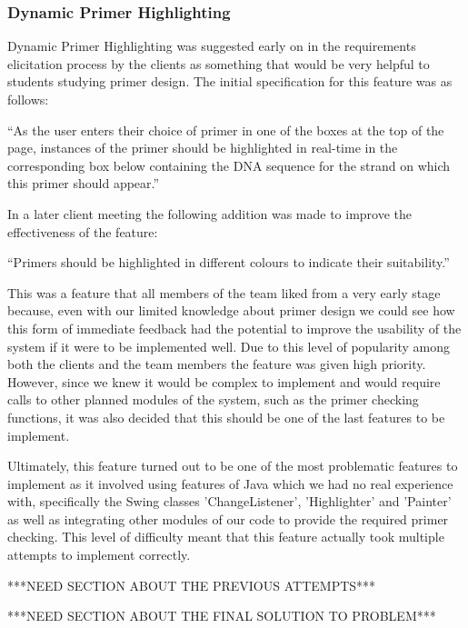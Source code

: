 \subsubsection{Dynamic Primer Highlighting}

Dynamic Primer Highlighting was suggested early on in the requirements
elicitation process by the clients as something that would be very
helpful to students studying primer design. The initial specification
for this feature was as follows:
	
“As the user enters their choice of primer in one of the boxes at the
top of the page, instances of the primer should be highlighted in
real-time in the corresponding box below containing the DNA sequence for
the strand on which this primer should appear.”

In a later client meeting the following addition was made to improve the
effectiveness of the feature:

“Primers should be highlighted in different colours to indicate their
suitability.”

This was a feature that all members of the team liked from a very early
stage because, even with our limited knowledge about primer design we
could see how this form of immediate feedback had the potential to
improve the usability of the system if it were to be implemented well.
Due to this level of popularity among both the clients and the team
members the feature was given high priority. However, since we knew it
would be complex to implement and would require calls to other planned
modules of the system, such as the primer checking functions, it was
also decided that this should be one of the last features to be
implement.

Ultimately, this feature turned out to be one of the most problematic
features to implement as it involved using features of Java which we had
no real experience with, specifically the Swing classes
'ChangeListener', 'Highlighter' and 'Painter' as well as integrating
other modules of our code to provide the required primer checking. This
level of difficulty meant that this feature actually took multiple
attempts to implement correctly.

***NEED SECTION ABOUT THE PREVIOUS ATTEMPTS***

***NEED SECTION ABOUT THE FINAL SOLUTION TO PROBLEM***
